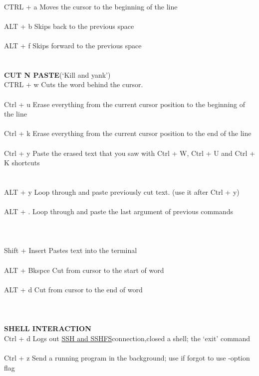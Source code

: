 \documentclass[10pt,a4paper]{article}
\begin{document}
{{{{{{{{{{{{{{{{{{{{\\
CTRL + a 	Moves the cursor to the beginning of the line\\
\\
ALT + b 		Skips back to the previous space\\
\\
ALT + f 		Skips forward to the previous space\\
\\
\\
\textbf{CUT N PASTE}}{\large  (‘Kill and yank’)\\
CTRL + w	Cuts the word behind the cursor. \\
\\
Ctrl + u		Erase everything from the current cursor position to the beginning of the line\\
\\
Ctrl + k		Erase everything from the current cursor position to the end of the line\\
\\
Ctrl + y		Paste the erased text that you saw with Ctrl + W, Ctrl + U and Ctrl + K shortcuts\\
\\
\\
ALT + y 		Loop through and paste previously cut text.  (use it after Ctrl + y)    \\
\\
ALT + .    	Loop through and paste the last argument of previous commands\\
\\
\\
\\
Shift + Insert	Pastes text into the terminal\\
\\
ALT + Bkspce 	Cut from cursor to the start of word\\
\\
ALT + d		Cut from cursor to the end of word\\
\\
\\
\\
\textbf{SHELL INTERACTION}}{\large \\
Ctrl + d 		Logs out \hyperlink{ssh___and_sshfs}{SSH   and SSHFS}}{\large  connection,closed a shell; the ‘exit’ command\\
\\
Ctrl + z		Send a running program in the background; use if forgot to use -option flag\\
\\
}}}}}}}}}}}}}}}}}}}}
\end{document}
